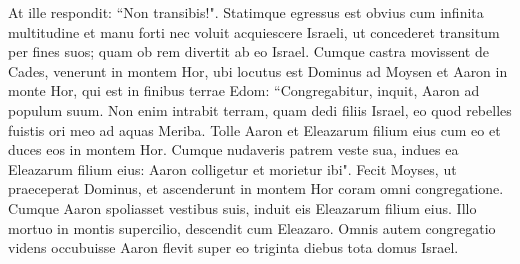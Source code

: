 \begin{biblechapter}
\verse At ille respondit: “Non transibis!". Statimque egressus est obvius cum infinita multitudine et manu forti 
\verse nec voluit acquiescere Israeli, ut concederet transitum per fines suos; quam ob rem divertit ab eo Israel. 
\verse Cumque castra movissent de Cades, venerunt in montem Hor, 
\verse ubi locutus est Dominus ad Moysen et Aaron in monte Hor, qui est in finibus terrae Edom:  
\verse “Congregabitur, inquit, Aaron ad populum suum. Non enim intrabit terram, quam dedi filiis Israel, eo quod rebelles fuistis ori meo ad aquas Meriba.  
\verse Tolle Aaron et Eleazarum filium eius cum eo et duces eos in montem Hor.  
\verse Cumque nudaveris patrem veste sua, indues ea Eleazarum filium eius: Aaron colligetur et morietur ibi". 
\verse Fecit Moyses, ut praeceperat Dominus, et ascenderunt in montem Hor coram omni congregatione. 
\verse Cumque Aaron spoliasset vestibus suis, induit eis Eleazarum filium eius. Illo mortuo in montis supercilio, descendit cum Eleazaro. 
\verse Omnis autem congregatio videns occubuisse Aaron flevit super eo triginta diebus tota domus Israel. 
\end{biblechapter}

